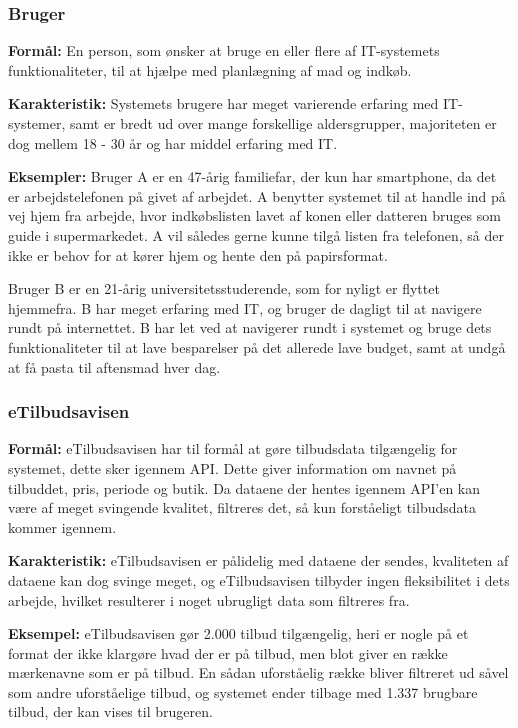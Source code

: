 \subsubsection*{Bruger}

\textbf{Formål:} En person, som ønsker at bruge en eller flere af IT-systemets funktionaliteter, til at hjælpe med planlægning af mad og indkøb.

\textbf{Karakteristik:} Systemets brugere har meget varierende erfaring med IT-systemer, samt er bredt ud over mange forskellige aldersgrupper, majoriteten er dog  mellem 18 - 30 år og har middel erfaring med IT.

\textbf{Eksempler:} Bruger A er en 47-årig familiefar, der kun har smartphone, da det er arbejdstelefonen på givet af arbejdet. 
A benytter systemet til at handle ind på vej hjem fra arbejde, hvor indkøbslisten lavet af konen eller datteren bruges som guide i supermarkedet. 
A vil således gerne kunne tilgå listen fra telefonen, så der ikke er behov for at kører hjem og hente den på papirsformat.

Bruger B er en 21-årig universitetsstuderende, som for nyligt er flyttet hjemmefra. B har meget erfaring med IT, og bruger de dagligt til at navigere rundt på internettet. 
B har let ved at navigerer rundt i systemet og bruge dets funktionaliteter til at lave besparelser på det allerede lave budget, samt at undgå at få pasta til aftensmad hver dag.

\subsubsection*{eTilbudsavisen}

\textbf{Formål:} eTilbudsavisen har til formål at gøre tilbudsdata tilgængelig for systemet, dette sker igennem API.
Dette giver information om navnet på tilbuddet, pris, periode og butik. 
Da dataene der hentes igennem API'en kan være af meget svingende kvalitet, filtreres det, så kun forståeligt tilbudsdata kommer igennem.

\textbf{Karakteristik:} eTilbudsavisen er pålidelig med dataene der sendes, kvaliteten af dataene kan dog svinge meget, og eTilbudsavisen tilbyder ingen fleksibilitet i dets arbejde, hvilket resulterer i noget ubrugligt data som filtreres fra.

\textbf{Eksempel:} eTilbudsavisen gør 2.000 tilbud tilgængelig, heri er nogle på et format der ikke klargøre hvad der er på tilbud, men blot giver en række mærkenavne som er på tilbud.
En sådan uforståelig række bliver filtreret ud såvel som andre uforståelige tilbud, og systemet ender tilbage med 1.337 brugbare tilbud, der kan vises til brugeren.

